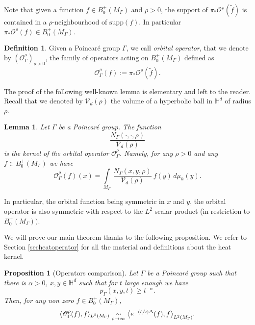 \documentclass[10pt]{amsart}
\let\mathcal\mathscr
\newcommand{\Psfrac}[2]{(\sfrac{#1}{#2})}
\theoremstyle{plain}
\newtheorem{proposition}[equation]{Proposition}
\newtheorem{lemma}[equation]{Lemma}
\theoremstyle{definition}
\newtheorem{definition}[equation]{Definition}
\newcommand{\HH}{\mathbb{H}}
\newcommand{\inte}[1]{\underset{#1}{\int}}
\newcommand{\supp}[1]{\mathrm{supp}(#1)}
\newcommand{\equivaut}[1]{\underset{#1}{\sim}}
\begin{document}
Note that given a function $f \in B^+_0(M_{\Gamma})$ and $\rho > 0$, the support of $\pi_*\mathcal{O}^{\rho}(\tilde{f})$ is contained in a $\rho$-neighbourhood of $\supp{f}$. In particular $\pi_*\mathcal{O}^{\rho}(f) \in B^+_0(M_{\Gamma})$.

\begin{definition}
Given a Poincaré group $\Gamma$, we call \emph{orbital operator}, that we denote by $(\mathcal{O}_{\Gamma}^\rho)_{\rho > 0}$, the family of operators acting on $B^+_0(M_{\Gamma})$ defined as
\[
\mathcal{O}_{\Gamma}^{\rho}(f) := \pi_* \mathcal{O}^{\rho}(\tilde{f}).
\]
\end{definition}

The proof of the following well-known lemma is elementary and left to the reader. Recall that we denoted by $\mathcal{V}_d(\rho)$ the volume of a hyperbolic ball in $\HH^d$ of radius $\rho$.
\begin{lemma}
\label{lemmaaverage}
Let $\Gamma$ be a Poincaré group. The function
\[
\frac{N_{\Gamma}(\cdot, \cdot, \rho)}{\mathcal{V}_d(\rho)}
\]
is the kernel of the orbital operator $\mathcal{O}_{\Gamma}^{\rho}$. Namely, for any $\rho > 0$ and any $f \in B^+_0(M_{\Gamma})$ we have
\[
\mathcal{O}_{\Gamma}^{\rho}(f)(x) = \inte{M_{\Gamma}} \ \frac{N_{\Gamma}(x,y,\rho)}{\mathcal{V}_d(\rho)} \ f(y) \,d \mu_h(y).
\]
\end{lemma}

In particular, the orbital function being symmetric in $x$ and $y$, the orbital operator is also symmetric with respect to the $L^2$-scalar product (in restriction to $B^+_0(M_{\Gamma}))$.

We will prove our main theorem thanks to the following proposition. We refer to Section \ref{secheatoperator} for all the material and definitions about the heat kernel.

\begin{proposition}[Operators comparison]
\label{propmaintheo}
Let $\Gamma$ be a Poincaré group such that there is $\alpha > 0$, $x,y \in \mathbb{H}^d$ such that for $t$ large enough we have
\[
p_{\Gamma}(x,y,t) \ge t^{-\alpha}.
\]
Then, for any non zero $f \in B^+_0(M_{\Gamma})$,
\[
\langle \mathcal{O}_{\Gamma}^{\rho}(f), f \rangle_{L^2(M_{\Gamma})} \equivaut{\rho \to \infty} \bigl< e^{- \Psfrac{\rho}{2} \Delta}(f), f \bigr>_{L^2(M_{\Gamma})}.
\]
\end{proposition}
\end{document}
